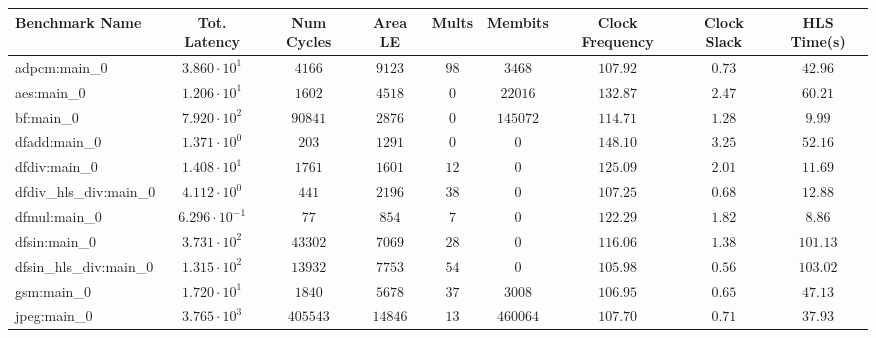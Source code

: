\begin{tabular}{|l|c|c|c|c|c|c|c|c|}
\hline
Benchmark Name          & Tot. Latency            & Num Cycles & Area LE   & Mults   & Membits    & Clock Frequency & Clock Slack & HLS Time(s) \\
\hline
adpcm:main\_0           & $ 3.860 \cdot 10^{1}  $ & $ 4166   $ & $ 9123  $ & $ 98  $ & $ 3468   $ & $ 107.92      $ & $ 0.73    $ & $ 42.96   $ \\
aes:main\_0             & $ 1.206 \cdot 10^{1}  $ & $ 1602   $ & $ 4518  $ & $ 0   $ & $ 22016  $ & $ 132.87      $ & $ 2.47    $ & $ 60.21   $ \\
bf:main\_0              & $ 7.920 \cdot 10^{2}  $ & $ 90841  $ & $ 2876  $ & $ 0   $ & $ 145072 $ & $ 114.71      $ & $ 1.28    $ & $ 9.99    $ \\
dfadd:main\_0           & $ 1.371 \cdot 10^{0}  $ & $ 203    $ & $ 1291  $ & $ 0   $ & $ 0      $ & $ 148.10      $ & $ 3.25    $ & $ 52.16   $ \\
dfdiv:main\_0           & $ 1.408 \cdot 10^{1}  $ & $ 1761   $ & $ 1601  $ & $ 12  $ & $ 0      $ & $ 125.09      $ & $ 2.01    $ & $ 11.69   $ \\
dfdiv\_hls\_div:main\_0 & $ 4.112 \cdot 10^{0}  $ & $ 441    $ & $ 2196  $ & $ 38  $ & $ 0      $ & $ 107.25      $ & $ 0.68    $ & $ 12.88   $ \\
dfmul:main\_0           & $ 6.296 \cdot 10^{-1} $ & $ 77     $ & $ 854   $ & $ 7   $ & $ 0      $ & $ 122.29      $ & $ 1.82    $ & $ 8.86    $ \\
dfsin:main\_0           & $ 3.731 \cdot 10^{2}  $ & $ 43302  $ & $ 7069  $ & $ 28  $ & $ 0      $ & $ 116.06      $ & $ 1.38    $ & $ 101.13  $ \\
dfsin\_hls\_div:main\_0 & $ 1.315 \cdot 10^{2}  $ & $ 13932  $ & $ 7753  $ & $ 54  $ & $ 0      $ & $ 105.98      $ & $ 0.56    $ & $ 103.02  $ \\
gsm:main\_0             & $ 1.720 \cdot 10^{1}  $ & $ 1840   $ & $ 5678  $ & $ 37  $ & $ 3008   $ & $ 106.95      $ & $ 0.65    $ & $ 47.13   $ \\
jpeg:main\_0            & $ 3.765 \cdot 10^{3}  $ & $ 405543 $ & $ 14846 $ & $ 13  $ & $ 460064 $ & $ 107.70      $ & $ 0.71    $ & $ 37.93   $ \\

\end{tabular}
